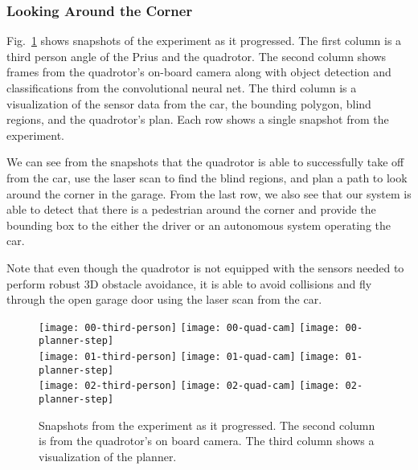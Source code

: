
\subsubsection{Looking Around the Corner}

Fig.~\ref{fig:experiment} shows snapshots of the experiment as it progressed.
The first column is a third person angle of the Prius and the quadrotor. The
second column shows frames from the quadrotor's on-board camera along with
object detection and classifications from the convolutional neural net. The
third column is a visualization of the sensor data from the car, the bounding
polygon, blind regions, and the quadrotor's plan. Each row shows a single
snapshot from the experiment.

We can see from the snapshots that the quadrotor is able to successfully take
off from the car, use the laser scan to find the blind regions, and plan a path
to look around the corner in the garage. From the last row, we also see that
our system is able to detect that there is a pedestrian around the corner and
provide the bounding box to the either the driver or an autonomous system
operating the car.

Note that even though the quadrotor is not equipped with the sensors needed to
perform robust 3D obstacle avoidance, it is able to avoid collisions and fly
through the open garage door using the laser scan from the car.

\begin{figure}[h!]

    \centering

    \texttt{[image: 00-third-person]}
    \texttt{[image: 00-quad-cam]}
    \texttt{[image: 00-planner-step]} \\
    \vspace*{1mm}
    \texttt{[image: 01-third-person]}
    \texttt{[image: 01-quad-cam]}
    \texttt{[image: 01-planner-step]} \\
    \vspace*{1mm}
    \texttt{[image: 02-third-person]}
    \texttt{[image: 02-quad-cam]}
    \texttt{[image: 02-planner-step]}

    \caption{Snapshots from the experiment as it progressed. The second column
        is from the quadrotor's on board camera. The third column shows a
    visualization of the planner.}

    \label{fig:experiment}

\end{figure}

